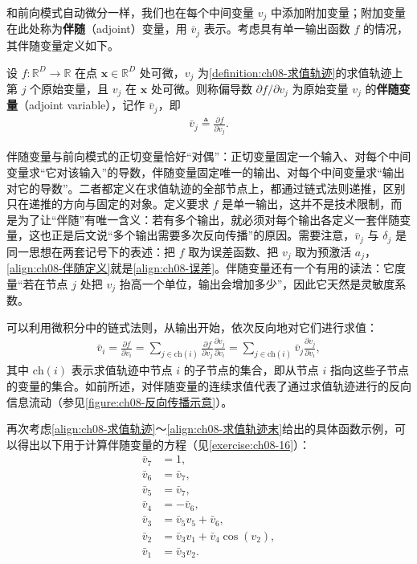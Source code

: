 \documentclass[../../main.tex]{subfiles}
\begin{document}
和前向模式自动微分一样，我们也在每个中间变量 $v_j$ 中添加附加变量；附加变量在此处称为\textbf{伴随}（adjoint）变量，用 $\bar{v}_j$ 表示。考虑具有单一输出函数 $f$ 的情况，其伴随变量定义如下。

\begin{definition}[伴随变量]\label{definition:ch08-伴随变量}
设 $f:\mathbb{R}^{D}\to\mathbb{R}$ 在点 $\mathbf{x}\in\mathbb{R}^{D}$ 处可微，$v_j$ 为\cref{definition:ch08-求值轨迹}的求值轨迹上第 $j$ 个原始变量，且 $v_j$ 在 $\mathbf{x}$ 处可微。则称偏导数 $\partial f/\partial v_j$ 为原始变量 $v_j$ 的\textbf{伴随变量}（adjoint variable），记作 $\bar{v}_j$，即
\begin{align}
\bar{v}_j\triangleq\frac{\partial f}{\partial v_j}.
\label{align:ch08-伴随定义}
\end{align}
\end{definition}

\begin{remark}
伴随变量与前向模式的正切变量恰好“对偶”：正切变量固定一个输入、对每个中间变量求“它对该输入”的导数，伴随变量固定唯一的输出、对每个中间变量求“输出对它的导数”。二者都定义在求值轨迹的全部节点上，都通过链式法则递推，区别只在递推的方向与固定的对象。定义要求 $f$ 是单一输出，这并不是技术限制，而是为了让“伴随”有唯一含义：若有多个输出，就必须对每个输出各定义一套伴随变量，这也正是后文说“多个输出需要多次反向传播”的原因。需要注意，$\bar{v}_j$ 与 $\delta_j$ 是同一思想在两套记号下的表述：把 $f$ 取为误差函数、把 $v_j$ 取为预激活 $a_j$，\eqref{align:ch08-伴随定义}就是\eqref{align:ch08-误差}。伴随变量还有一个有用的读法：它度量“若在节点 $j$ 处把 $v_j$ 抬高一个单位，输出会增加多少”，因此它天然是灵敏度系数。
\end{remark}

可以利用微积分中的链式法则，从输出开始，依次反向地对它们进行求值：
\begin{align}
\bar{v}_i=\frac{\partial f}{\partial v_i}=\sum_{j\in\mathrm{ch}(i)}\frac{\partial f}{\partial v_j}\frac{\partial v_j}{\partial v_i}
=\sum_{j\in\mathrm{ch}(i)}\bar{v}_j\frac{\partial v_j}{\partial v_i},
\label{align:ch08-伴随链式}
\end{align}
其中 $\mathrm{ch}(i)$ 表示求值轨迹中节点 $i$ 的子节点的集合，即从节点 $i$ 指向这些子节点的变量的集合。如前所述，对伴随变量的连续求值代表了通过求值轨迹进行的反向信息流动（参见\cref{figure:ch08-反向传播示意}）。

再次考虑\eqref{align:ch08-求值轨迹}～\eqref{align:ch08-求值轨迹末}给出的具体函数示例，可以得出以下用于计算伴随变量的方程（见\cref{exercise:ch08-16}）：
\begin{align}
\bar{v}_7&=1,\label{align:ch08-伴随轨迹}\\
\bar{v}_6&=\bar{v}_7,\nonumber\\
\bar{v}_5&=\bar{v}_7,\nonumber\\
\bar{v}_4&=-\bar{v}_6,\nonumber\\
\bar{v}_3&=\bar{v}_5v_5+\bar{v}_6,\nonumber\\
\bar{v}_2&=\bar{v}_3v_1+\bar{v}_4\cos\left(v_2\right),\nonumber\\
\bar{v}_1&=\bar{v}_3v_2.
\label{align:ch08-伴随轨迹末}
\end{align}
\end{document}
